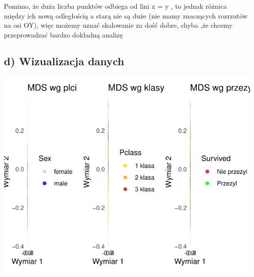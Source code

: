 \documentclass[
  12pt,
]{article}
\begin{document}
Pomimo, że duża liczba punktów odbiega od lini x = y , to jednak różnica
między ich nową odległością a starą nie są duże (nie mamy znaczących
rozrzutów na osi OY), więc możemy uznać skalowanie za dość dobre, chyba
,że chcemy przeprowadzać bardzo dokładną analizę

\subsection{d) Wizualizacja danych}\label{d-wizualizacja-danych}

\begin{center}\includegraphics{Sprawozdanie2_files/figure-latex/rozrzut 2D-1} \end{center}
\end{document}

